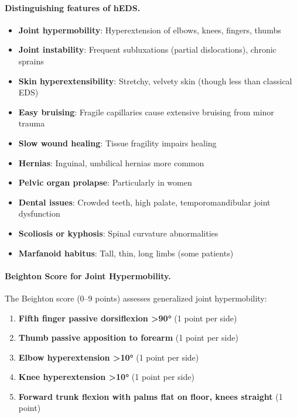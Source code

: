 \begin{observation}
\paragraph{Distinguishing features of hEDS.}
\begin{itemize}
    \item \textbf{Joint hypermobility}: Hyperextension of elbows, knees, fingers, thumbs
    \item \textbf{Joint instability}: Frequent subluxations (partial dislocations), chronic sprains
    \item \textbf{Skin hyperextensibility}: Stretchy, velvety skin (though less than classical EDS)
    \item \textbf{Easy bruising}: Fragile capillaries cause extensive bruising from minor trauma
    \item \textbf{Slow wound healing}: Tissue fragility impairs healing
    \item \textbf{Hernias}: Inguinal, umbilical hernias more common
    \item \textbf{Pelvic organ prolapse}: Particularly in women
    \item \textbf{Dental issues}: Crowded teeth, high palate, temporomandibular joint dysfunction
    \item \textbf{Scoliosis or kyphosis}: Spinal curvature abnormalities
    \item \textbf{Marfanoid habitus}: Tall, thin, long limbs (some patients)
\end{itemize}

\paragraph{Beighton Score for Joint Hypermobility.}

The Beighton score (0--9 points) assesses generalized joint hypermobility:

\begin{enumerate}
    \item \textbf{Fifth finger passive dorsiflexion >90°} (1 point per side)
    \item \textbf{Thumb passive apposition to forearm} (1 point per side)
    \item \textbf{Elbow hyperextension >10°} (1 point per side)
    \item \textbf{Knee hyperextension >10°} (1 point per side)
    \item \textbf{Forward trunk flexion with palms flat on floor, knees straight} (1 point)
\end{enumerate}


\end{observation}
